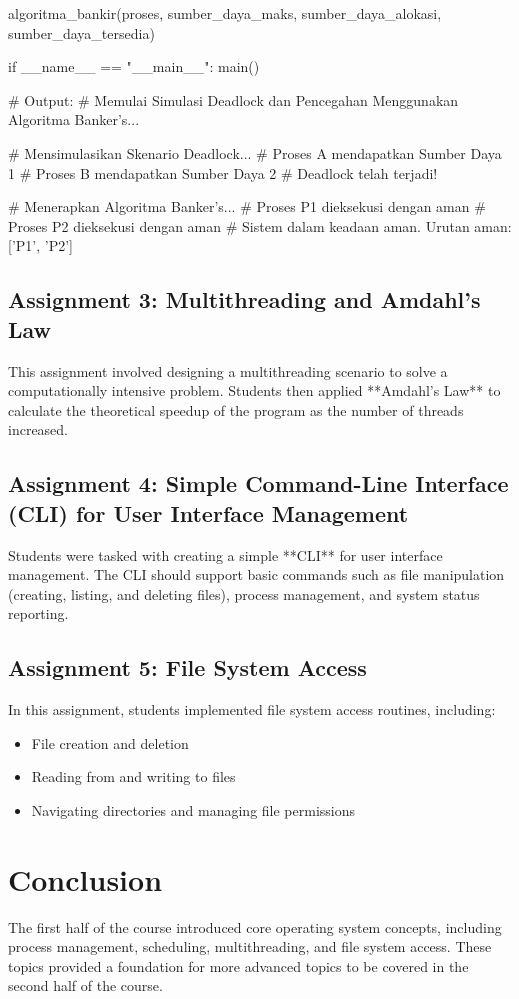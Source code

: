 \documentclass[12pt]{article}
\begin{document}
\begin{itemize}
\begin{python}
    algoritma_bankir(proses, sumber_daya_maks, sumber_daya_alokasi, sumber_daya_tersedia)

if __name__ == "__main__":
    main()

# Output:
# Memulai Simulasi Deadlock dan Pencegahan Menggunakan Algoritma Banker's...

# Mensimulasikan Skenario Deadlock...
# Proses A mendapatkan Sumber Daya 1
# Proses B mendapatkan Sumber Daya 2
# Deadlock telah terjadi!

# Menerapkan Algoritma Banker's...
# Proses P1 dieksekusi dengan aman
# Proses P2 dieksekusi dengan aman
# Sistem dalam keadaan aman. Urutan aman: ['P1', 'P2']
    \end{python}
\end{itemize}

\subsection{Assignment 3: Multithreading and Amdahl's Law}
This assignment involved designing a multithreading scenario to solve a computationally intensive problem. Students then applied **Amdahl's Law** to calculate the theoretical speedup of the program as the number of threads increased.

\subsection{Assignment 4: Simple Command-Line Interface (CLI) for User Interface Management}
Students were tasked with creating a simple **CLI** for user interface management. The CLI should support basic commands such as file manipulation (creating, listing, and deleting files), process management, and system status reporting.

\subsection{Assignment 5: File System Access}
In this assignment, students implemented file system access routines, including:
\begin{itemize}
    \item File creation and deletion
    \item Reading from and writing to files
    \item Navigating directories and managing file permissions
\end{itemize}
\section{Conclusion}
The first half of the course introduced core operating system concepts, including process management, scheduling, multithreading, and file system access. These topics provided a foundation for more advanced topics to be covered in the second half of the course.
\end{document}
